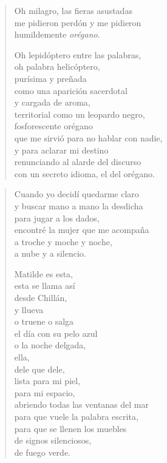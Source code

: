 \documentclass[12pt]{article}
\begin{document}
\begin{verse}
Oh milagro, las fieras asustadas\\
me pidieron perdón y me pidieron\\
humildemente \emph{orégano}.  

Oh lepidóptero entre las palabras,\\
oh palabra helicóptero,\\
purísima y preñada\\
como una aparición sacerdotal\\
y cargada de aroma,\\
territorial como un leopardo negro,\\
fosforescente orégano\\
que me sirvió para no hablar con nadie,\\
y para aclarar mi destino\\
renunciando al alarde del discurso\\
con un secreto idioma, el del orégano.  

\end{verse}

\clearpage
{}
\begin{verse}

Cuando yo decidí quedarme claro\\
y buscar mano a mano la desdicha\\
para jugar a los dados,\\
encontré la mujer que me acompaña\\
a troche y moche y noche,\\
a nube y a silencio.  

Matilde es esta,\\
esta se llama así\\
desde Chillán,\\
y llueva\\
o truene o salga\\
el día con su pelo azul\\
o la noche delgada,\\
ella,\\
dele que dele,\\
lista para mi piel,\\
para mi espacio,\\
abriendo todas las ventanas del mar\\
para que vuele la palabra escrita,\\
para que se llenen los muebles\\
de signos silenciosos,\\
de fuego verde.  

\end{verse}
\end{document}
